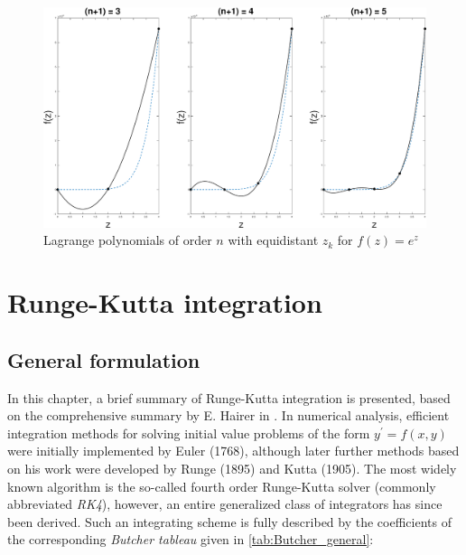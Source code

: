 \documentclass[./main.tex]{subfiles}
\begin{document}
\begin{figure}[h!]
	\includegraphics[width = 1.0\textwidth]{figures/lagrange_interp_plot1.eps}
	\caption{Lagrange polynomials of order $n$ with equidistant $z_k$ for $f(z) = e^z$}
	\label{lagrange_interp}
\end{figure}

%


\newpage
\chapter{Runge-Kutta integration}
\label{chap:AppendixB}
\section{General formulation}
In this chapter, a brief summary of Runge-Kutta integration is presented, based on the comprehensive summary by E. Hairer in \cite{Hairer}. 
In numerical analysis, efficient integration methods for solving initial value problems of the form $y^\prime = f(x,y)$ were initially implemented by Euler (1768), although later further methods based on his work were developed by Runge (1895) and Kutta (1905). The most widely known algorithm is the so-called fourth order Runge-Kutta solver (commonly abbreviated \textit{RK4}), however, an entire generalized class of integrators has since been derived. Such an integrating scheme is fully described by the coefficients of the corresponding \textit{Butcher tableau} given in \ref{tab:Butcher_general}:
\end{document}
